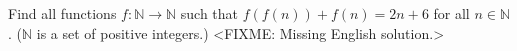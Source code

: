 \problem
Find all functions  $f \colon \mathbb{N} \to \mathbb{N}$ such that
$f(f(n)) + f(n) = 2 n + 6$ for all $n \in \mathbb{N}$.
($\mathbb{N}$ is a set of positive integers.)
\solution
<FIXME: Missing English solution.>
\endproblem
